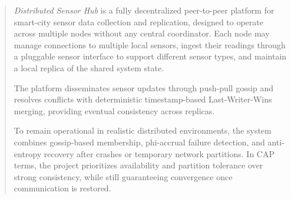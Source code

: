 \begin{abstract}
\textit{Distributed Sensor Hub} is a fully decentralized peer-to-peer platform for smart-city sensor data collection and replication, designed to operate across multiple nodes without any central coordinator. Each node may manage connections to multiple local sensors, ingest their readings through a pluggable sensor interface to support different sensor types, and maintain a local replica of the shared system state.

The platform disseminates sensor updates through push-pull gossip and resolves conflicts with deterministic timestamp-based Last-Writer-Wins merging, providing eventual consistency across replicas.

To remain operational in realistic distributed environments, the system combines gossip-based membership, phi-accrual failure detection, and anti-entropy recovery after crashes or temporary network partitions. In CAP terms, the project prioritizes availability and partition tolerance over strong consistency, while still guaranteeing convergence once communication is restored.
\end{abstract}

\clearpage
